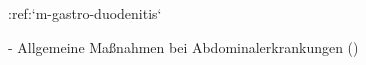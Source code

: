 :ref:`m-gastro-duodenitis`
\begin{itemize}
  -   Allgemeine Maßnahmen bei Abdominalerkrankungen
  ()
\end{itemize}